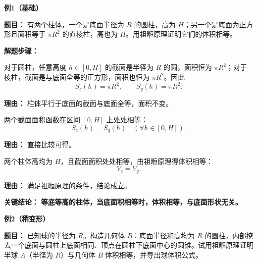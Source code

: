 \begin{examplebox}
	\textbf{\textcolor{CExample}{例1（基础）}}

	\textbf{\textcolor{CExample}{题目：}}
	有两个柱体，一个是底面半径为 $R$ 的圆柱，高为 $H$；另一个是底面为正方形且面积等于 $\pi R^2$ 的直棱柱，高也为 $H$。用祖暅原理证明它们的体积相等。

	\textbf{\textcolor{CExample}{解题步骤：}}
	\begin{description}[style=nextline, leftmargin=2.8em, labelsep=0.5em, itemsep=0.45em]
		\item[\textbf{第一步（截面面积）：}] 对于圆柱，任意高度 $h\in[0,H]$ 的截面是半径为 $R$ 的圆，面积恒为 $\pi R^2$；对于棱柱，截面是与底面全等的正方形，面积也恒为 $\pi R^2$。因此
			\[
				S_c(h) = \pi R^2,
				\qquad
				S_q(h) = \pi R^2.
			\]
			\par\textbf{理由：} 柱体平行于底面的截面与底面全等，面积不变。
		\item[\textbf{第二步（面积相等）：}] 两个截面面积函数在区间 $[0,H]$ 上处处相等：
			\[
				S_c(h) = S_q(h) \quad (\forall h\in[0,H]).
			\]
			\par\textbf{理由：} 直接比较可得。
		\item[\textbf{第三步（套用原理）：}] 两个柱体高均为 $H$，且截面面积处处相等，由祖暅原理得体积相等：
			\[
				V_c = V_q.
			\]
			\par\textbf{理由：} 满足祖暅原理的条件，结论成立。
	\end{description}

	\textbf{\textcolor{CExample}{关键结论：}}
	\textbf{等底等高的柱体，当底面积相等时，体积相等，与底面形状无关。}

	\medskip
	\textbf{\textcolor{CExample}{例2（稍变形）}}

	\textbf{\textcolor{CExample}{题目：}}
	已知球的半径为 $R$。构造几何体 $B$：底面半径和高均为 $R$ 的圆柱，内部挖去一个底面与圆柱上底面相同、顶点在圆柱下底面中心的圆锥。试用祖暅原理证明半球 $A$（半径为 $R$）与几何体 $B$ 体积相等，并导出球体积公式。


\end{examplebox}
